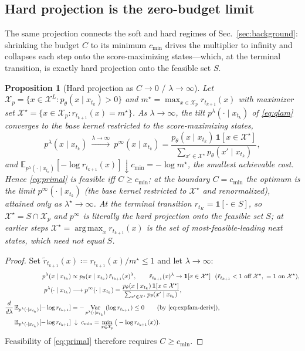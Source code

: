 \documentclass{article}
\newtheorem{proposition}{Proposition}
\DeclareMathOperator{\Var}{Var}
\DeclareMathOperator*{\argmax}{arg\,max}
\newcommand{\E}{\mathbb{E}}
\newcommand{\X}{\mathcal{X}}
\newcommand{\lstar}{\lambda^{\star}}
\begin{document}
\subsection{Hard projection is the zero-budget limit}
The same projection connects the soft and hard regimes of Sec.~\ref{sec:background}: shrinking the budget $C$ to its minimum $c_{\min}$ drives the multiplier to infinity and collapses each step onto the score-maximizing states---which, at the terminal transition, is exactly hard projection onto the feasible set $S$.

\begin{proposition}[Hard projection as $C\to0$ / $\lambda\to\infty$]
\label{prop:hard}
Let $\X_p=\{x\in\X^L:p_\theta(x\mid x_{t_k})>0\}$ and $m^\star=\max_{x\in\X_p}r_{t_{k+1}}(x)$ with maximizer set $\X^\star=\{x\in\X_p:r_{t_{k+1}}(x)=m^\star\}$. As $\lambda\to\infty$, the tilt $p^{\lambda}(\cdot\mid x_{t_k})$ of \eqref{eq:qlam} converges to the base kernel restricted to the score-maximizing states,
\begin{equation}
p^{\lambda}(x\mid x_{t_k})\ \xrightarrow{\lambda\to\infty}\
p^{\infty}(x\mid x_{t_k})=\frac{p_\theta(x\mid x_{t_k})\,\mathbf 1[x\in\X^\star]}{\sum_{x'\in\X^\star}p_\theta(x'\mid x_{t_k})},
\end{equation}
and $\E_{p^{\lambda}(\cdot\mid x_{t_k})}[-\log r_{t_{k+1}}(x)]\downarrow c_{\min}=-\log m^\star$, the smallest achievable cost. Hence \eqref{eq:primal} is feasible iff $C\ge c_{\min}$; at the boundary $C=c_{\min}$ the optimum is the limit $p^{\infty}(\cdot\mid x_{t_k})$ (the base kernel restricted to $\X^\star$ and renormalized), attained only as $\lstar\to\infty$. At the terminal transition $r_{t_K}=\mathbf 1[\cdot\in S]$, so $\X^\star=S\cap\X_p$ and $p^{\infty}$ is literally the hard projection onto the feasible set $S$; at earlier steps $\X^\star=\argmax_x r_{t_{k+1}}(x)$ is the set of most-feasible-leading next states, which need not equal $S$.
\end{proposition}
\begin{proof}
Set $\tilde r_{t_{k+1}}(x)\coloneqq r_{t_{k+1}}(x)/m^\star\le1$ and let $\lambda\to\infty$:
\begin{align*}
p^{\lambda}(x\mid x_{t_k})&\propto p_\theta(x\mid x_{t_k})\,\tilde r_{t_{k+1}}(x)^{\lambda},
  \qquad \tilde r_{t_{k+1}}(x)^{\lambda}\to\mathbf 1[x\in\X^\star]\ \ (\tilde r_{t_{k+1}}<1\ \text{off}\ \X^\star,\ =1\ \text{on}\ \X^\star),\\
p^{\lambda}(\cdot\mid x_{t_k})&\longrightarrow p^{\infty}(\cdot\mid x_{t_k})=\frac{p_\theta(x\mid x_{t_k})\,\mathbf 1[x\in\X^\star]}{\sum_{x'\in\X^\star}p_\theta(x'\mid x_{t_k})},\\
\frac{d}{d\lambda}\,\E_{p^{\lambda}(\cdot\mid x_{t_k})}[-\log r_{t_{k+1}}]
  &=-\Var_{p^{\lambda}(\cdot\mid x_{t_k})}(\log r_{t_{k+1}})\le0
  \qquad(\text{by }\eqref{eq:expfam-deriv}),\\
\E_{p^{\lambda}(\cdot\mid x_{t_k})}[-\log r_{t_{k+1}}]&\;\downarrow\;c_{\min}=\min_{x\in\X_p}\big(-\log r_{t_{k+1}}(x)\big).
\end{align*}
Feasibility of \eqref{eq:primal} therefore requires $C\ge c_{\min}$.
\end{proof}
\end{document}
